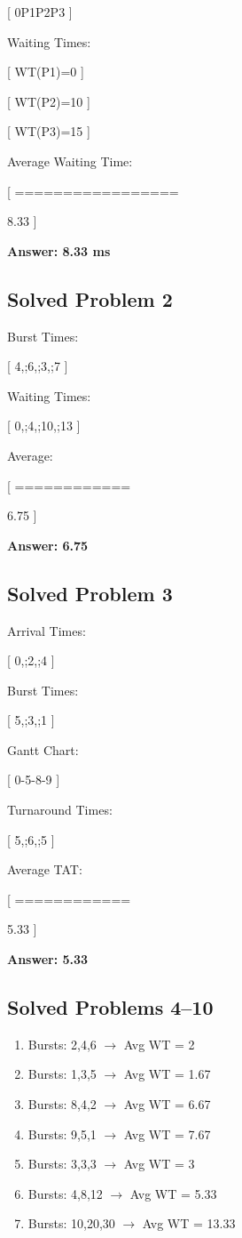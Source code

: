 [
0\quad P1\quad P2\quad P3
]

Waiting Times:

[
WT(P1)=0
]

[
WT(P2)=10
]

[
WT(P3)=15
]

Average Waiting Time:

[
=================

8.33
]

\textbf{Answer: 8.33 ms}

\subsection{Solved Problem 2}

Burst Times:

[
4,;6,;3,;7
]

Waiting Times:

[
0,;4,;10,;13
]

Average:

[
============

6.75
]

\textbf{Answer: 6.75}

\subsection{Solved Problem 3}

Arrival Times:

[
0,;2,;4
]

Burst Times:

[
5,;3,;1
]

Gantt Chart:

[
0-5-8-9
]

Turnaround Times:

[
5,;6,;5
]

Average TAT:

[
============

5.33
]

\textbf{Answer: 5.33}

\subsection{Solved Problems 4--10}

\begin{enumerate}
\item Bursts: 2,4,6 $\rightarrow$ Avg WT = 2
\item Bursts: 1,3,5 $\rightarrow$ Avg WT = 1.67
\item Bursts: 8,4,2 $\rightarrow$ Avg WT = 6.67
\item Bursts: 9,5,1 $\rightarrow$ Avg WT = 7.67
\item Bursts: 3,3,3 $\rightarrow$ Avg WT = 3
\item Bursts: 4,8,12 $\rightarrow$ Avg WT = 5.33
\item Bursts: 10,20,30 $\rightarrow$ Avg WT = 13.33
\end{enumerate}

